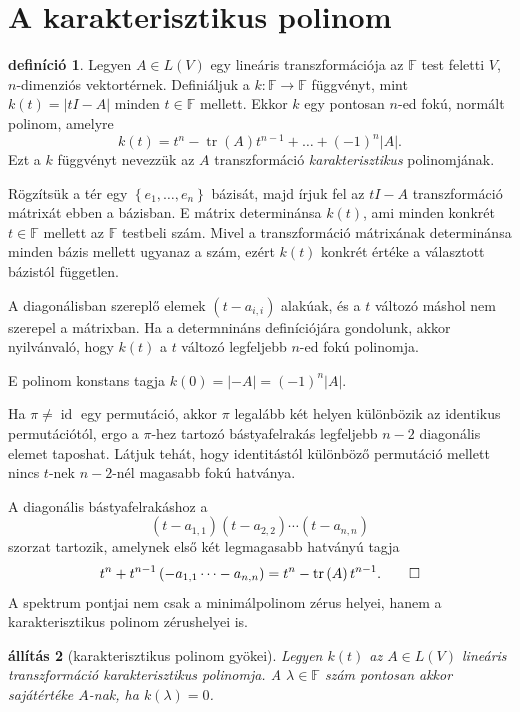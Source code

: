 \documentclass[a4paper, showtrims]{memoir}
\makeatletter
\renewenvironment{proof}[1][\proofname]
    {\par\pushQED{\qed}%
    \normalfont \topsep6\p@\@plus6\p@\relax
    \trivlist
    \item[\hskip\labelsep
        \itshape
    #1\@addpunct{:}]\ignorespaces}
    {\popQED\endtrivlist\@endpefalse}
\theoremstyle{plain}
\newtheorem{proposition}{állítás}[chapter]
\theoremstyle{remark}
\theoremstyle{definition}
\newtheorem{definition}[proposition]{definíció}
\DeclareMathOperator{\tr}{tr}
\DeclareMathOperator{\id}{id}
\makeatother
\begin{document}
\section{A karakterisztikus polinom}
\begin{definition}
	Legyen $A\in L\left( V \right)$ egy lineáris transzformációja az $\mathbb{F}$ test feletti $V$,
	$n$-dimenziós vektortérnek.
	Definiáljuk a $k:\mathbb{F}\to\mathbb{F}$ függvényt, mint
	$k\left( t \right)=|tI-A|$ minden $t\in\mathbb{F}$ mellett.
	Ekkor $k$ egy pontosan $n$-ed fokú, normált polinom,
	amelyre
	\[
		k\left( t \right)
		=
		t^n-\tr(A)t^{n-1}+\dots+\left( -1 \right)^n|A|.
	\]
	Ezt a $k$ függvényt nevezzük az
	$A$ transzformáció \emph{karakterisztikus}
    polinomjának.
\end{definition}
\begin{proof}
	Rögzítsük a tér egy $\left\{ e_1,\ldots,e_n \right\}$ bázisát,
	majd írjuk fel az $tI-A$ transzformáció mátrixát ebben a bázisban.
	E mátrix determinánsa $k\left( t \right)$,
	ami minden konkrét $t\in\mathbb{F}$ mellett az $\mathbb{F}$ testbeli szám.
	Mivel a transzformáció mátrixának determinánsa minden bázis mellett ugyanaz a szám,
	ezért $k\left( t \right)$ konkrét értéke a választott bázistól független.

	A diagonálisban szereplő elemek $\left( t-a_{i,i} \right)$ alakúak,
	és a $t$ változó máshol nem szerepel a mátrixban.
	Ha a determnináns definíciójára gondolunk, akkor nyilvánvaló, hogy $k\left( t \right)$ a $t$
	változó legfeljebb $n$-ed fokú polinomja.

	E polinom konstans tagja $k\left( 0 \right)=|-A|=\left( -1 \right)^n|A|.$

	Ha $\pi\neq\id$ egy permutáció,
	akkor $\pi$ legalább két helyen különbözik az identikus permutációtól,
	ergo a $\pi$-hez tartozó bástyafelrakás legfeljebb $n-2$ diagonális elemet taposhat.
	Látjuk tehát,
	hogy identitástól különböző permutáció mellett nincs $t$-nek $n-2$-nél magasabb fokú hatványa.

	A diagonális bástyafelrakáshoz a
	\[
		\left( t-a_{1,1} \right)\left( t-a_{2,2} \right)\cdots\left( t-a_{n,n} \right)
	\]
	szorzat tartozik, amelynek első két legmagasabb hatványú tagja
	\[
		t^n+t^{n-1}\left( -a_{1,1}\dots-a_{n,n} \right)=t^n-\tr\left( A \right)t^{n-1}.\qedhere
	\]
\end{proof}
A spektrum pontjai nem csak a minimálpolinom zérus helyei,
hanem a karakterisztikus polinom zérushelyei is.
\begin{proposition}[karakterisztikus polinom gyökei]
	Legyen $k\left( t \right)$ az $A\in L\left( V \right)$ lineáris transzformáció karakterisztikus polinomja.
	A $\lambda\in\mathbb{F}$ szám pontosan akkor sajátértéke $A$-nak,
	ha $k\left( \lambda \right)=0$.
\end{proposition}
\end{document}
